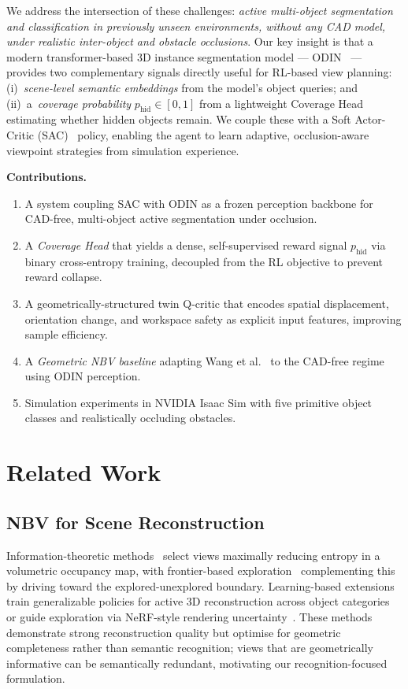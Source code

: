 \documentclass{article}
\newcommand{\phid}{p_{\text{hid}}}
\begin{document}
We address the intersection of these challenges: \emph{active multi-object segmentation and classification in previously unseen environments, without any CAD model, under realistic inter-object and obstacle occlusions}. Our key insight is that a modern transformer-based 3D instance segmentation model --- ODIN~\citep{odin2024} --- provides two complementary signals directly useful for RL-based view planning: (i)~\emph{scene-level semantic embeddings} from the model's object queries; and (ii)~a~\emph{coverage probability} $\phid\in[0,1]$ from a lightweight Coverage Head estimating whether hidden objects remain. We couple these with a Soft Actor-Critic (SAC)~\citep{haarnoja2018sac} policy, enabling the agent to learn adaptive, occlusion-aware viewpoint strategies from simulation experience.

\textbf{Contributions.}
\begin{enumerate}
\item A system coupling SAC with ODIN as a frozen perception backbone for CAD-free, multi-object active segmentation under occlusion.
\item A \emph{Coverage Head} that yields a dense, self-supervised reward signal $\phid$ via binary cross-entropy training, decoupled from the RL objective to prevent reward collapse.
\item A geometrically-structured twin Q-critic that encodes spatial displacement, orientation change, and workspace safety as explicit input features, improving sample efficiency.
\item A \emph{Geometric NBV baseline} adapting Wang et al.~\citep{wang2019active} to the CAD-free regime using ODIN perception.
\item Simulation experiments in NVIDIA Isaac Sim with five primitive object classes and realistically occluding obstacles.
\end{enumerate}

\section{Related Work}

\subsection{NBV for Scene Reconstruction}

Information-theoretic methods~\citep{hornung2013octomap,vasquez2014volumetric,bircher2016receding} select views maximally reducing entropy in a volumetric occupancy map, with frontier-based exploration~\citep{yamauchi1997frontier} complementing this by driving toward the explored-unexplored boundary. Learning-based extensions train generalizable policies for active 3D reconstruction across object categories~\citep{gennbv2024} or guide exploration via NeRF-style rendering uncertainty~\citep{uncertainty_driven,activenerf2022}. These methods demonstrate strong reconstruction quality but optimise for geometric completeness rather than semantic recognition; views that are geometrically informative can be semantically redundant, motivating our recognition-focused formulation.
\end{document}
